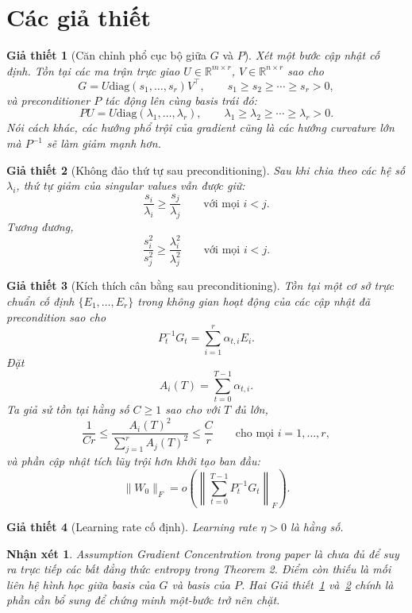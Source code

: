 \documentclass[11pt,a4paper]{article}
\newtheorem{assumption}{Giả thiết}
\newtheorem{remark}{Nhận xét}
\newcommand{\RR}{\mathbb{R}}
\newcommand{\diag}{\mathrm{diag}}
\begin{document}
\section{Các giả thiết}

\begin{assumption}[Căn chỉnh phổ cục bộ giữa $G$ và $P$]
\label{ass:alignment}
Xét một bước cập nhật cố định. Tồn tại các ma trận trực giao $U \in \RR^{m \times r}$, $V \in \RR^{n \times r}$ sao cho
\[
G = U\diag(s_1,\ldots,s_r)V^\top,
\qquad
s_1 \ge s_2 \ge \cdots \ge s_r > 0,
\]
và preconditioner $P$ tác động lên cùng basis trái đó:
\[
P U = U\diag(\lambda_1,\ldots,\lambda_r),
\qquad
\lambda_1 \ge \lambda_2 \ge \cdots \ge \lambda_r > 0.
\]
Nói cách khác, các hướng phổ trội của gradient cũng là các hướng curvature lớn mà $P^{-1}$ sẽ làm giảm mạnh hơn.
\end{assumption}

\begin{assumption}[Không đảo thứ tự sau preconditioning]
\label{ass:no_reorder}
Sau khi chia theo các hệ số $\lambda_i$, thứ tự giảm của singular values vẫn được giữ:
\[
\frac{s_i}{\lambda_i} \ge \frac{s_j}{\lambda_j}
\qquad \text{với mọi } i<j.
\]
Tương đương,
\[
\frac{s_i^2}{s_j^2} \ge \frac{\lambda_i^2}{\lambda_j^2}
\qquad \text{với mọi } i<j.
\]
\end{assumption}

\begin{assumption}[Kích thích cân bằng sau preconditioning]
\label{ass:balanced_excitation}
Tồn tại một cơ sở trực chuẩn cố định $\{E_1,\dots,E_r\}$ trong không gian hoạt động của các cập nhật đã precondition sao cho
\[
P_t^{-1}G_t = \sum_{i=1}^r \alpha_{t,i}E_i.
\]
Đặt
\[
A_i(T) = \sum_{t=0}^{T-1} \alpha_{t,i}.
\]
Ta giả sử tồn tại hằng số $C \ge 1$ sao cho với $T$ đủ lớn,
\[
\frac{1}{Cr} \le \frac{A_i(T)^2}{\sum_{j=1}^r A_j(T)^2} \le \frac{C}{r}
\qquad \text{cho mọi } i=1,\dots,r,
\]
và phần cập nhật tích lũy trội hơn khởi tạo ban đầu:
\[
\|W_0\|_F = o\!\left(\left\|\sum_{t=0}^{T-1} P_t^{-1}G_t\right\|_F\right).
\]
\end{assumption}

\begin{assumption}[Learning rate cố định]
\label{ass:lr}
Learning rate $\eta > 0$ là hằng số.
\end{assumption}

\begin{remark}
Assumption Gradient Concentration trong paper là chưa đủ để suy ra trực tiếp các bất đẳng thức entropy trong Theorem 2. Điểm còn thiếu là mối liên hệ hình học giữa basis của $G$ và basis của $P$. Hai Giả thiết~\ref{ass:alignment} và~\ref{ass:no_reorder} chính là phần cần bổ sung để chứng minh một-bước trở nên chặt.
\end{remark}
\end{document}
